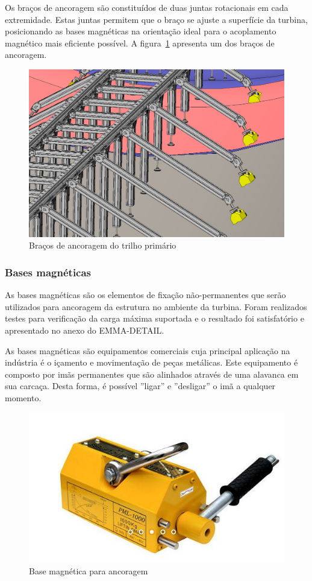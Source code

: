 Os braços de ancoragem são constituídos de duas juntas rotacionais em cada
extremidade. Estas juntas permitem que o braço se ajuste a superfície da
turbina, posicionando as bases magnéticas na orientação ideal para o acoplamento
magnético mais eficiente possível. A figura~\ref{fig::ancoragem} apresenta um
dos braços de ancoragem.

\begin{figure}[H]
	\centering
	\includegraphics[width=0.9\columnwidth]{figs/construcao/ancoragem}
	\caption{Braços de ancoragem do trilho primário}
    \label{fig::ancoragem}
\end{figure}

\subsubsection{Bases magnéticas}

As bases magnéticas são os elementos de fixação não-permanentes que serão
utilizados para ancoragem da estrutura no ambiente da turbina. Foram realizados
testes para verificação da carga máxima suportada e o resultado foi
satisfatório e apresentado no anexo do EMMA-DETAIL.

As bases magnéticas são equipamentos comerciais cuja principal aplicação na
indústria é o içamento e movimentação de peças metálicas. Este equipamento é
composto por imãs permanentes que são alinhados através de uma alavanca em sua
carcaça. Desta forma, é possível ''ligar'' e ''desligar'' o imã a qualquer
momento.

\begin{figure}[H]
	\centering
	\includegraphics[width=0.5\columnwidth]{figs/construcao/base_magnetica}
	\caption{Base magnética para ancoragem}
    \label{fig::base_magnetica}
\end{figure}

